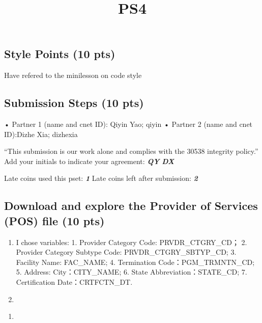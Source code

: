 \documentclass[
  letterpaper,
  DIV=11,
  numbers=noendperiod]{scrartcl}
\title{PS4}
\author{}
\date{}
\providecommand{\tightlist}{%
  \setlength{\itemsep}{0pt}\setlength{\parskip}{0pt}}\usepackage{longtable,booktabs,array}
\begin{document}
\maketitle



\subsection{Style Points (10 pts)}\label{style-points-10-pts}

Have refered to the minilesson on code style

\subsection{Submission Steps (10 pts)}\label{submission-steps-10-pts}

• Partner 1 (name and cnet ID): Qiyin Yao; qiyin • Partner 2 (name and
cnet ID):Dizhe Xia; dizhexia

``This submission is our work alone and complies with the 30538
integrity policy.'' Add your initials to indicate your agreement:
\textbf{\emph{QY}} \textbf{\emph{DX}}

Late coins used this pset: \textbf{\emph{1}} Late coins left after
submission: \textbf{\emph{2}}

\subsection{Download and explore the Provider of Services (POS) file (10
pts)}\label{download-and-explore-the-provider-of-services-pos-file-10-pts}

\begin{enumerate}
\def\labelenumi{\arabic{enumi}.}
\item
  I chose variables: 1. Provider Category Code: PRVDR\_CTGRY\_CD； 2.
  Provider Category Subtype Code: PRVDR\_CTGRY\_SBTYP\_CD; 3. Facility
  Name: FAC\_NAME; 4. Termination Code：PGM\_TRMNTN\_CD; 5. Address:
  City：CITY\_NAME; 6. State Abbreviation：STATE\_CD; 7. Certification
  Date：CRTFCTN\_DT.
\item
\end{enumerate}

\begin{enumerate}
\def\labelenumi{\alph{enumi}.}
\tightlist
\item
\end{enumerate}
\end{document}
